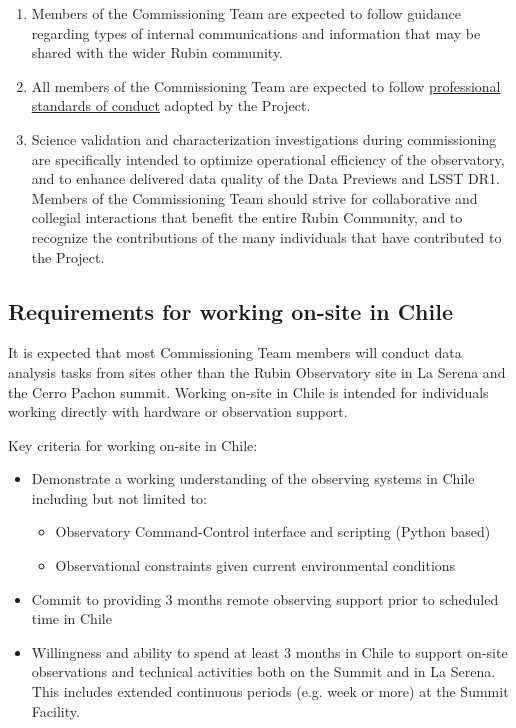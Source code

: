 \documentclass[SE,authoryear,toc]{lsstdoc}
\begin{document}
\begin{enumerate}
\item Members of the Commissioning Team are expected to follow guidance regarding types of internal communications and information that may be shared with the wider Rubin community.

\item All members of the Commissioning Team are expected to follow \href{https://www.lsst.org/scientists/codes-of-conduct}{professional standards of conduct} adopted by the Project.

\item Science validation and characterization investigations during commissioning are specifically intended to optimize operational efficiency of the observatory, and to enhance delivered data quality of the Data Previews and LSST DR1. Members of the Commissioning Team should strive for collaborative and collegial interactions that benefit the entire Rubin Community, and to recognize the contributions of the many individuals that have contributed to the Project. 

\end{enumerate}

\subsection{Requirements for working on-site in Chile}
\label{chile}

It is expected that most Commissioning Team members will conduct data analysis tasks from sites other than the Rubin Observatory site in La Serena and the Cerro Pachon summit. Working on-site in Chile is intended for individuals working directly with hardware or observation support. 

Key criteria for working on-site in Chile:
\begin{itemize}
\item Demonstrate a working understanding of the observing systems in Chile including but not limited to:
	\begin{itemize}
	\item Observatory Command-Control interface and scripting (Python based)
	\item Observational constraints given current environmental conditions
	\end{itemize}
\item Commit to providing 3 months remote observing support prior to scheduled time in Chile
\item Willingness and ability to spend at least 3 months in Chile to support on-site observations and technical activities both on the Summit and in La Serena. This includes extended continuous periods (e.g. week or more) at the Summit Facility.
\end{itemize}
\end{document}
